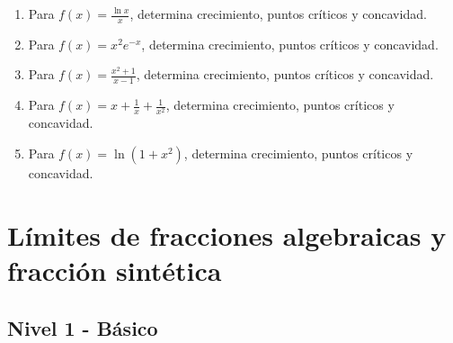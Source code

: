 \documentclass[11pt,a4paper]{article}
\begin{document}
\begin{enumerate}[label=\textbf{E\arabic*.},start=181]
\item Para $f(x)=\frac{\ln x}{x}$, determina crecimiento, puntos críticos y concavidad.

\item Para $f(x)=x^2e^{-x}$, determina crecimiento, puntos críticos y concavidad.

\item Para $f(x)=\frac{x^2+1}{x-1}$, determina crecimiento, puntos críticos y concavidad.

\item Para $f(x)=x+\frac{1}{x}+\frac{1}{x^2}$, determina crecimiento, puntos críticos y concavidad.

\item Para $f(x)=\ln(1+x^2)$, determina crecimiento, puntos críticos y concavidad.

\end{enumerate}

\newpage

\section{Límites de fracciones algebraicas y fracción sintética}

\subsection{Nivel 1 - Básico}
\end{document}
